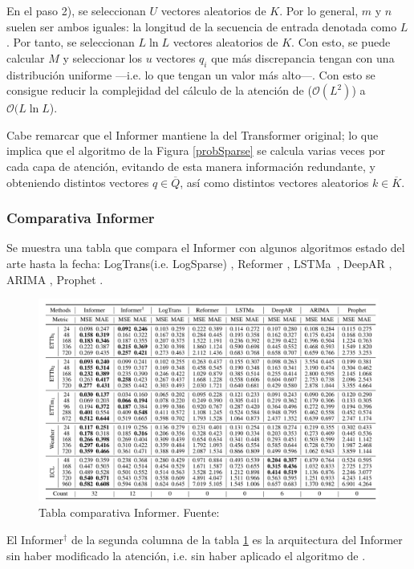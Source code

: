 En el paso 2), se seleccionan $U$ vectores aleatorios de $K$. Por lo general, $m$ y $n$ suelen ser ambos iguales: la longitud de la secuencia de entrada denotada como $L$. Por tanto, se seleccionan $L \ln L$ vectores aleatorios de $K$. Con esto, se puede calcular $M$ y seleccionar los $u$ vectores $q_i$ que más discrepancia tengan con una distribución uniforme ---i.e. lo que tengan un valor más alto---. Con esto se consigue reducir la complejidad del cálculo de la atención de ($\mathcal{O}(L ^2)$) a $\mathcal{O}(L \ln L$).

Cabe remarcar que el Informer mantiene la  del Transformer original; lo que implica que el algoritmo de la Figura \ref{probSparse} se calcula varias veces por cada capa de atención, evitando de esta manera información redundante, y obteniendo distintos vectores $q \in \overline{Q}$, así como distintos vectores aleatorios $k \in \overline{K}$.

\subsubsection{Comparativa Informer}
\label{ap:inf_res}

Se muestra una tabla que compara el Informer con algunos algoritmos estado del arte hasta la fecha: LogTrans(i.e. LogSparse) \parencite{logSparse}, Reformer \parencite{reformer}, LSTMa\fnm\ \parencite{rnnPlusAttention}, DeepAR \parencite{deepAR}, ARIMA \parencite{ARIMA}, Prophet \parencite{Prophet}.

\begin{figure}[H]
    \centering
    \includegraphics[scale = 0.6]{imgs/informer_results.png}
    \caption{Tabla comparativa Informer. \scriptsize{Fuente: \parencite{informer}}}
    \label{inf_results}
\end{figure}

\begin{nota}
    El Informer$^{\dag}$ de la segunda columna de la tabla \ref{inf_results} es la arquitectura del Informer sin haber modificado la atención, i.e. sin haber aplicado el algoritmo de .
\end{nota}
